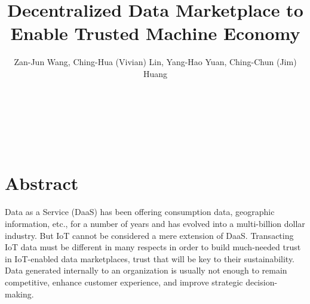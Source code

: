 \documentclass[journal,10pt,a4paper]{IEEEtran}
\begin{document}
\title{\Large\textbf{Decentralized Data Marketplace to Enable Trusted Machine Economy}}
\author{
    \large Zan-Jun Wang, Ching-Hua (Vivian) Lin, Yang-Hao Yuan, Ching-Chun (Jim) Huang

     \\
     \\
     \\

     \\

     \\

}

\maketitle
\section*{\normalsize\textbf{Abstract}}
Data as a Service (DaaS) has been offering consumption data, geographic information, etc., for a number of years and has evolved into a multi-billion dollar industry. But IoT cannot be considered a mere extension of DaaS. Transacting IoT data must be different in many respects in order to build much-needed trust in IoT-enabled data marketplaces, trust that will be key to their sustainability. Data generated internally to an organization is usually not enough to remain competitive, enhance customer experience, and improve strategic decision-making.
\end{document}
